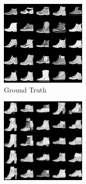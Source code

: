 \begin{figure}[H]
    \centering
    \begin{subfigure}[b]{0.24\textwidth}
        \centering
        \includegraphics[width=\textwidth]{figures/einsum/9fashion-mnist_ground_truth.png}
        \caption{Ground Truth}
    \end{subfigure}
    \begin{subfigure}[b]{0.24\textwidth}
        \centering
        \includegraphics[width=\textwidth]{figures/einsum/9fashion-mnist_EM.png}

\end{subfigure}
\end{figure}
